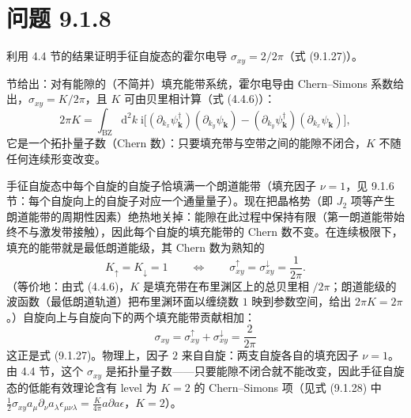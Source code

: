 \section*{问题 9.1.8}
\begin{problem}
利用 4.4 节的结果证明手征自旋态的霍尔电导 $\sigma_{xy}=2/2\pi$（式 (9.1.27)）。
\end{problem}
 节给出：对有能隙的（不简并）填充能带系统，霍尔电导由 Chern--Simons 系数给出，$\sigma_{xy}=K/2\pi$，且 $K$ 可由贝里相计算（式 (4.4.6)）：
\begin{equation*}
2\pi K=\int_{\text{BZ}}\mathrm{d}^{2}k\;
\mathrm{i}\big[(\partial_{k_x}\psi^{\dagger}_{\pmb{k}})(\partial_{k_y}\psi_{\pmb{k}})-(\partial_{k_y}\psi^{\dagger}_{\pmb{k}})(\partial_{k_x}\psi_{\pmb{k}})\big] ,
\end{equation*}
它是一个拓扑量子数（Chern 数）：只要填充带与空带之间的能隙不闭合，$K$ 不随任何连续形变改变。

手征自旋态中每个自旋的自旋子恰填满一个朗道能带（填充因子 $\nu=1$，见 9.1.6 节：每个自旋向上的自旋子对应一个通量量子）。现在把晶格势（即 $J_2$ 项等产生朗道能带的周期性因素）绝热地关掉：能隙在此过程中保持有限（第一朗道能带始终不与激发带接触），因此每个自旋的填充能带的 Chern 数不变。在连续极限下，填充的能带就是最低朗道能级，其 Chern 数为熟知的
\begin{equation*}
K_{\uparrow}=K_{\downarrow}=1
\qquad\Longleftrightarrow\qquad
\sigma_{xy}^{\uparrow}=\sigma_{xy}^{\downarrow}=\frac{1}{2\pi} .
\end{equation*}
（等价地：由式 (4.4.6)，$K$ 是填充带在布里渊区上的总贝里相 $/2\pi$；朗道能级的波函数（最低朗道轨道）把布里渊环面以缠绕数 $1$ 映到参数空间，给出 $2\pi K=2\pi$。）自旋向上与自旋向下的两个填充能带贡献相加：
\begin{equation*}
\boxed{\;\sigma_{xy}=\sigma_{xy}^{\uparrow}+\sigma_{xy}^{\downarrow}=\frac{2}{2\pi}\;}
\end{equation*}
这正是式 (9.1.27)。物理上，因子 $2$ 来自自旋：两支自旋各自的填充因子 $\nu=1$。由 4.4 节，这个 $\sigma_{xy}$ 是拓扑量子数——只要能隙不闭合就不能改变，因此手征自旋态的低能有效理论含有 level 为 $K=2$ 的 Chern--Simons 项（见式 (9.1.28) 中 $\frac12\sigma_{xy}a_{\mu}\partial_{\nu}a_{\lambda}\epsilon_{\mu\nu\lambda}=\frac{K}{4\pi}a\partial a\epsilon$，$K=2$）。

